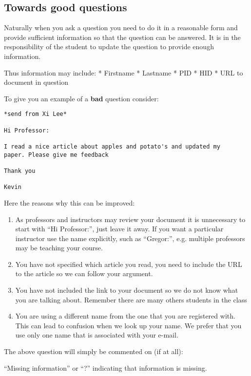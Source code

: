 \subsection{Towards good questions}\label{towards-good-questions}

Naturally when you ask a question you need to do it in a reasonable form
and provide sufficient information so that the question can be answered.
It is in the responsibility of the student to update the question to
provide enough information.

Thus information may include: * Firstname * Lastname * PID * HID * URL
to document in question

To give you an example of a \textbf{bad} question consider:

\begin{verbatim}
*send from Xi Lee*

Hi Professor:

I read a nice article about apples and potato's and updated my
paper. Please give me feedback

Thank you

Kevin
\end{verbatim}

Here the reasons why this can be improved:

\begin{enumerate}
\def\labelenumi{\arabic{enumi}.}
\tightlist
\item
  As professors and instructors may review your document it is
  unnecessary to start with ``Hi Professor:'', just leave it away. If
  you want a particular instructor use the name explicitly, such as
  ``Gregor:'', e.g. multiple professors may be teaching your course.
\item
  You have not specified which article you read, you need to include the
  URL to the article so we can follow your argument.
\item
  You have not included the link to your document so we do not know what
  you are talking about. Remember there are many others students in the
  class
\item
  You are using a different name from the one that you are registered
  with. This can lead to confusion when we look up your name. We prefer
  that you use only one name that is associated with your e-mail.
\end{enumerate}

The above question will simply be commented on (if at all):

``Missing information'' or ``?'' indicating that information is missing.

